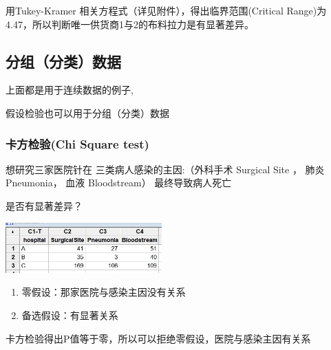用Tukey-Kramer 相关方程式（详见附件），得出临界范围(Critical Range)为 4.47，所以判断唯一供货商1与2的布料拉力是有显著差异。 


\hypertarget{ux65b9ux5deeux5206ux67901-anova-test}{%
\subsection{分组（分类）数据}\label{ux65b9ux5deeux5206ux67901-anova-test}}

上面都是用于连续数据的例子,

假设检验也可以用于分组（分类）数据

\hypertarget{ux5361ux65b9ux68c0ux9a8cchi-square-test}{%
\subsubsection{卡方检验(Chi Square
test)}\label{ux5361ux65b9ux68c0ux9a8cchi-square-test}}

想研究三家医院针在 三类病人感染的主因:（外科手术 Surgical Site ， 肺炎
Pneumonia， 血液 Bloodstream） 最终导致病人死亡

是否有显著差异？


\includegraphics[width=6cm]{4chiSquareDataScreenshot_2022-07-24_110053.jpg}

\begin{enumerate}
\tightlist
\item
  零假设：那家医院与感染主因没有关系
\item
  备选假设：有显著关系
\end{enumerate}

卡方检验得出P值等于零，所以可以拒绝零假设，医院与感染主因有关系


